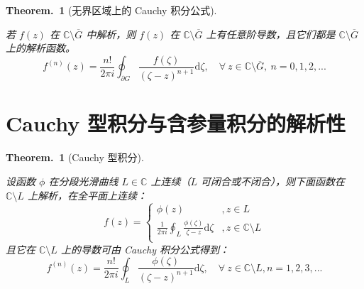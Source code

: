 \documentclass[UTF8]{report}
\def\C{\mathbb{C}}
\theoremstyle{MyLineTheoremStyle} %
\theoremstyle{MyBlockTheoremStyle} %
\newtheorem{BlockTheorem}[LineTheorem]{Theorem.\,} %
\theoremstyle{MySubsubsectionStyle} %
\begin{document}
\begin{BlockTheorem}[无界区域上的 Cauchy 积分公式]\label{无界区域上的 Cauchy 积分公式}

若 $f(z)$ 在 $ \C \setminus \overline{G} $ 中解析，则 $f(z)$ 在 $\C \setminus \overline{G}$ 上有任意阶导数，且它们都是 $\C \setminus \overline{G} $ 上的解析函数。
\begin{equation}
f^{(n)}(z) = \frac{n !}{2\pi i}\oint_{\partial G} \frac{f(\zeta)}{(\zeta - z)^{n+1}} \mathrm{d} \zeta,\quad \forall\ z \in\C \setminus \overline{G},\ n = 0,1,2,...
\end{equation} 

\end{BlockTheorem}

\section{Cauchy 型积分与含参量积分的解析性}

\begin{BlockTheorem}[Cauchy 型积分]\label{Cauchy 型积分}

设函数 $\phi$ 在分段光滑曲线 $L \in \C$ 上连续（$L$ 可闭合或不闭合），则下面函数在 $\C \setminus L$ 上解析，在全平面上连续：
\begin{equation}
f (z) = 
\begin{cases}
    \phi(z) &, z \in L \\
    \displaystyle \frac{1}{2\pi i}\oint_{L} \frac{\phi(\zeta)}{\zeta - z} \mathrm{d} \zeta &, z \in \C \setminus L \\ 
\end{cases}
\end{equation}
且它在 $\C \setminus L$ 上的导数可由 Cauchy 积分公式得到：
\begin{equation}
f^{(n)}(z) = \frac{n !}{2\pi i}\oint_{L} \frac{\phi(\zeta)}{(\zeta - z)^{n+1}} \mathrm{d} \zeta,\quad \forall\ z \in \C \setminus L, n = 1,2,3,...
\end{equation}

\end{BlockTheorem}
\end{document}
